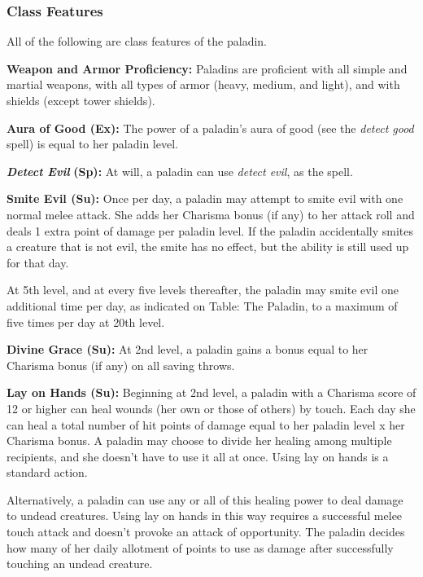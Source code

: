 \documentclass{article}
\begin{document}
\vspace{12pt}
\subsubsection*{\textbf{Class Features}}

All of the following are class features of the paladin.

\textbf{Weapon and Armor Proficiency:} Paladins are proficient with all simple 
and martial weapons, with all types of armor (heavy, medium, and light), and with 
shields (except tower shields).

\textbf{Aura of Good (Ex):} The power of a paladin's aura of good (see the \textit{detect 
good }spell) is equal to her paladin level.

\textit{\textbf{Detect Evil }}\textbf{(Sp):} At will, a paladin can use \textit{detect 
evil}, as the spell.

\textbf{Smite Evil (Su):} Once per day, a paladin may attempt to smite evil with 
one normal melee attack. She adds her Charisma bonus (if any) to her attack roll 
and deals 1 extra point of damage per paladin level. If the paladin accidentally 
smites a creature that is not evil, the smite has no effect, but the ability is 
still used up for that day.

At 5th level, and at every five levels thereafter, the paladin may smite evil one 
additional time per day, as indicated on Table: The Paladin, to a maximum of five 
times per day at 20th level.

\textbf{Divine Grace (Su):} At 2nd level, a paladin gains a bonus equal to her 
Charisma bonus (if any) on all saving throws.

\textbf{Lay on Hands (Su):} Beginning at 2nd level, a paladin with a Charisma score 
of 12 or higher can heal wounds (her own or those of others) by touch. Each day 
she can heal a total number of hit points of damage equal to her paladin level 
x her Charisma bonus. A paladin may choose to divide her healing among multiple 
recipients, and she doesn't have to use it all at once. Using lay on hands is a 
standard action.

Alternatively, a paladin can use any or all of this healing power to deal damage 
to undead creatures. Using lay on hands in this way requires a successful melee 
touch attack and doesn't provoke an attack of opportunity. The paladin decides 
how many of her daily allotment of points to use as damage after successfully touching 
an undead creature.
\end{document}
